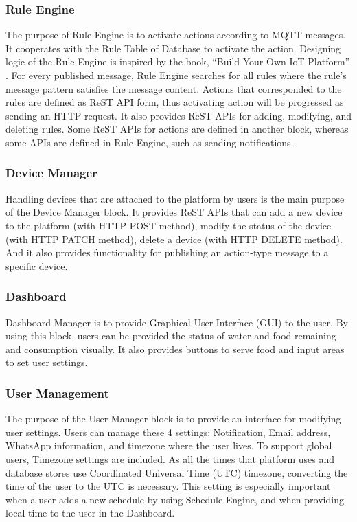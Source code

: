 \documentclass[conference]{IEEEtran}
\begin{document}
\subsubsection{Rule Engine}
\hfill \break The purpose of Rule Engine is to activate actions according to MQTT messages. It cooperates with the Rule Table of Database to activate the action. Designing logic of the Rule Engine is inspired by the book, “Build Your Own IoT Platform” \cite{b25}. For every published message, Rule Engine searches for all rules where the rule’s message pattern satisfies the message content. Actions that corresponded to the rules are defined as ReST API form, thus activating action will be progressed as sending an HTTP request. It also provides ReST APIs for adding, modifying, and deleting rules. Some ReST APIs for actions are defined in another block, whereas some APIs are defined in Rule Engine, such as sending notifications.

\subsubsection{Device Manager}
\hfill \break Handling devices that are attached to the platform by users is the main purpose of the Device Manager block. It provides ReST APIs that can add a new device to the platform (with HTTP POST method), modify the status of the device (with HTTP PATCH method), delete a device (with HTTP DELETE method). And it also provides functionality for publishing an action-type message to a specific device.

\subsubsection{Dashboard}
\hfill \break Dashboard Manager is to provide Graphical User Interface (GUI) to the user. By using this block, users can be provided the status of water and food remaining and consumption visually. It also provides buttons to serve food and input areas to set user settings.

\subsubsection{User Management}
\hfill \break The purpose of the User Manager block is to provide an interface for modifying user settings. Users can manage these 4 settings: Notification, Email address, WhatsApp information, and timezone where the user lives.  To support global users, Timezone settings are included. As all the times that platform uses and database stores use Coordinated Universal Time (UTC) timezone, converting the time of the user to the UTC is necessary. This setting is especially important when a user adds a new schedule by using Schedule Engine, and when providing local time to the user in the Dashboard.
\end{document}
